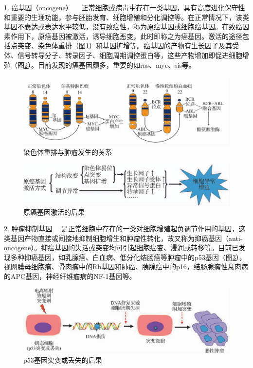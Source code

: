 {1. 癌基因（oncogene）}
　正常细胞或病毒中存在一类基因，具有高度进化保守性和重要的生理功能，参与胚胎发育、细胞增殖和分化调控等。在正常情况下，该类基因不表达或表达水平较低，没有致癌性，称为原癌基因或细胞癌基因。在致癌因素作用下，原癌基因被激活，诱导细胞恶变，此时即称之为癌基因。激活的途径包括点突变、染色体重排（图\ref{fig5-20}）和基因扩增等。癌基因的产物有生长因子及其受体、信号转导分子、转录因子、细胞周期调控蛋白等，这些产物增加即促进细胞增殖（图\ref{fig5-21}）。目前发现的癌基因颇多，重要的如ras、myc、sis等。

\begin{figure}[!htbp]
 \centering
 \includegraphics[scale=1.2]{./images/Image00089.jpg}
 \caption{染色体重排与肿瘤发生的关系}
 \label{fig5-20}
  \end{figure}

\begin{figure}[!htbp]
 \centering
 \includegraphics{./images/Image00090.jpg}
 \caption{原癌基因激活的后果}
 \label{fig5-21}
  \end{figure}

{2. 肿瘤抑制基因}
　是正常细胞中存在的一类对细胞增殖起负调节作用的基因，这类基因产物直接或间接地抑制细胞增生和肿瘤性转化，故又称为抑癌基因（anti-oncogene）。抑癌基因的失活或突变均可引起细胞癌变、浸润或转移等。目前已发现多种抑癌基因，如乳腺癌、白血病、低分化结肠癌等肿瘤中的p53基因（图\ref{fig5-22}），视网膜母细胞瘤、骨肉瘤中的Rb基因和肺癌、胰腺癌中的p16，结肠腺瘤性息肉病的APC基因，神经纤维瘤病的NF-1基因等。

\begin{figure}[!htbp]
 \centering
 \includegraphics[scale=1.1]{./images/Image00091.jpg}
 \caption{p53基因突变或丢失的后果}
 \label{fig5-22}
  \end{figure}

